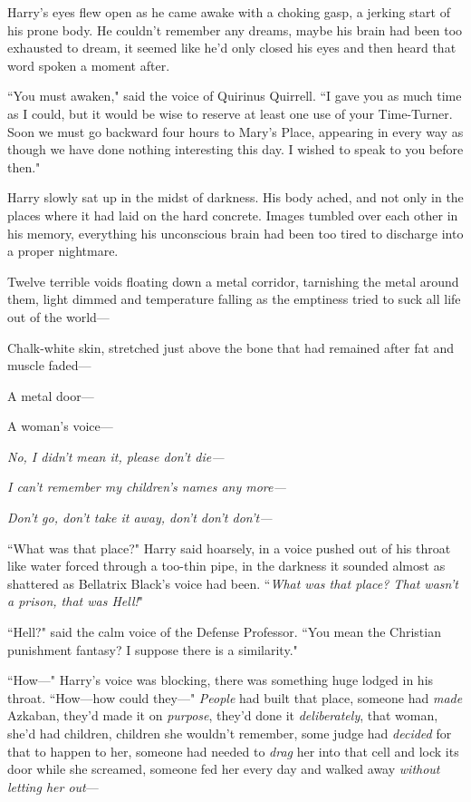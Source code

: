 

\hplettrineextrapara
Harry's eyes flew open as he came awake with a choking gasp, a jerking start of his prone body. He couldn't remember any dreams, maybe his brain had been too exhausted to dream, it seemed like he'd only closed his eyes and then heard that word spoken a moment after.

``You must awaken," said the voice of Quirinus Quirrell. ``I gave you as much time as I could, but it would be wise to reserve at least one use of your Time-Turner. Soon we must go backward four hours to Mary's Place, appearing in every way as though we have done nothing interesting this day. I wished to speak to you before then."

Harry slowly sat up in the midst of darkness. His body ached, and not only in the places where it had laid on the hard concrete. Images tumbled over each other in his memory, everything his unconscious brain had been too tired to discharge into a proper nightmare.

Twelve terrible voids floating down a metal corridor, tarnishing the metal around them, light dimmed and temperature falling as the emptiness tried to suck all life out of the world—

Chalk-white skin, stretched just above the bone that had remained after fat and muscle faded—

A metal door—

A woman's voice—

\emph{No, I didn't mean it, please don't die—}

\emph{I can't remember my children's names any more—}

\emph{Don't go, don't take it away, don't don't don't—}

``What was that place?" Harry said hoarsely, in a voice pushed out of his throat like water forced through a too-thin pipe, in the darkness it sounded almost as shattered as Bellatrix Black's voice had been. ``\emph{What was that place? That wasn't a prison, that was \emph{Hell!}}"

``Hell?" said the calm voice of the Defense Professor. ``You mean the Christian punishment fantasy? I suppose there is a similarity."

``How—" Harry's voice was blocking, there was something huge lodged in his throat. ``How—how could they—" \emph{People} had built that place, someone had \emph{made} Azkaban, they'd made it on \emph{purpose}, they'd done it \emph{deliberately}, that woman, she'd had children, children she wouldn't remember, some judge had \emph{decided} for that to happen to her, someone had needed to \emph{drag} her into that cell and lock its door while she screamed, someone fed her every day and walked away \emph{without letting her out}—


